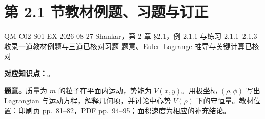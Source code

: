 \section{第 2.1 节教材例题、习题与订正}
\label{exercise-set:QM-C02-S01}

\exercisemeta
  {QM-C02-S01-EX}
  {2026-08-27}
  {Shankar，第 2 章 \S 2.1，例 2.1.1 与练习 2.1.1--2.1.3}
  {收录一道教材例题与三道已核对习题}
  {题意、Euler--Lagrange 推导与关键计算已核对}


\textbf{对应知识点：}。

\textbf{题意。}质量为 $m$ 的粒子在平面内运动，势能为 $V(x,y)$。用极坐标 $(\rho,\phi)$ 写出 Lagrangian 与运动方程，解释几何项，并讨论中心势 $V(\rho)$ 下的守恒量。教材位置：印刷页 pp.~81--82，PDF pp.~94--95；面积速度为相应的补充结论。

